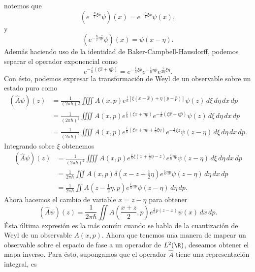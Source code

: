notemos que
\[
  \left( e^{-\frac{\hbar}{i} \xi \hat{x}} \psi \right)(x)
  = e^{-\frac{\hbar}{i} \xi x}\psi(x),
\] 
y 
\[
  \left( e^{-\frac{\hbar}{i} \eta \hat{p}} \psi \right)(x)
  = \psi(x-\eta).
\] 
Además haciendo uso de la identidad de
Baker-Campbell-Hausdorff, podemos separar el operador
exponencial como
\[
  e^{-\frac{i}{\hbar}(\xi \hat{x} + \eta \hat{p})}
  = e^{-\frac{i}{\hbar} \xi \hat{x}} e^{-\frac{i}{\hbar}
  \eta \hat{p}} e^{\frac{i}{2\hbar} \xi \eta}.
\] 
Con ésto, podemos expresar la transformación de Weyl de un
observable sobre un estado puro como
\begin{align}
  \left(\hat{A}\psi\right)(z)
  &= \frac{1}{(2\pi\hbar)2} 
  \iiiint A(x,p) e^{\frac{i}{\hbar}[\xi(x-\hat{x}) +
  \eta(p-\hat{p})]} \psi(z) \, d\xi \, d\eta \, dx \, dp
  \\
  &= \frac{1}{(2\pi\hbar)^2} \iiiint A(x,p)
  e^{\frac{i}{\hbar}(\xi x + \eta
  p)}e^{-\frac{i}{\hbar}(\xi \hat{x} + \eta \hat{p})}
  \psi(z) \, d\xi \, d\eta \, dx \, dp \\
  &= \frac{1}{(2\pi\hbar)^2} \iiiint A(x,p)
  e^{\frac{i}{\hbar}(\xi x + \eta p + \frac{1}{2} \xi
  \eta)} e^{-\frac{i}{\hbar} \xi z}\psi(z - \eta) \, d\xi
  \, d\eta \, dx \, dp.
\end{align}
Integrando sobre $\xi$ obtenemos
\begin{align*}
  \left( \hat{A} \psi \right)(z)
  &= \frac{1}{(2\pi\hbar)^2} \iiiint A(x,p)
  e^{\frac{i}{\hbar}\xi(x + \frac{1}{2}\eta - z)}
  e^{\frac{i}{\hbar} \eta p} \psi(z-\eta) \, d\xi \, d\eta
  \, dx \, dp \\
  &= \frac{1}{2\pi\hbar} \iiint A(x,p) \delta(x - z +
  \tfrac{1}{2}\eta) e^{\frac{i}{\hbar} \eta p} \psi(z -
  \eta) \, d\eta \, dx \, dp \\
  &= \frac{1}{2\pi\hbar} \iint A(z - \tfrac{1}{2} \eta, p)
  e^{\frac{i}{\hbar} \eta p} \psi(z- \eta) \, d\eta \, dp.
\end{align*}
Ahora hacemos el cambio de variable $x = z - \eta$ para
obtener 
\begin{equation}
  \label{eqn:weyl_map}
  \left( \hat{A}\psi \right)(z)
  = \frac{1}{2\pi\hbar} \iint A\left( \frac{x+z}{2},
  p\right) e^{\frac{i}{\hbar} p (z-x)} \psi(x) \, dx \,
  dp.
\end{equation}
Ésta última expresión es la más común cuando se habla de
la cuantización de Weyl de un observable $A(x,p)$. Ahora
que tenemos una manera de mapear un observable sobre el
espacio de fase a un operador de $L^2(\R)$, deseamos
obtener el mapa inverso. Para ésto, supongamos que el
operador $\hat{A}$ tiene una representación integral, es
